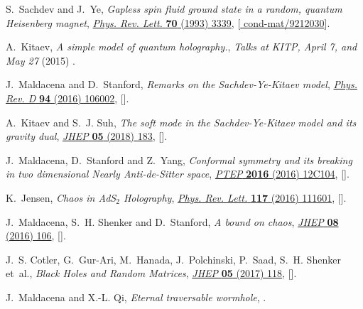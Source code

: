 \begin{thebibliography}{10}
S.~Sachdev and J.~Ye, \emph{{Gapless spin fluid ground state in a random,
  quantum Heisenberg magnet}},
  \href{http://dx.doi.org/10.1103/PhysRevLett.70.3339}{\emph{Phys. Rev. Lett.}
  {\bfseries 70} (1993) 3339},
  [\href{https://arxiv.org/abs/cond-mat/9212030}{{\ttfamily
  cond-mat/9212030}}].

A.~Kitaev, \emph{A simple model of quantum holography.}, {\emph{Talks at KITP,
  April 7, and May 27} (2015) }.

J.~Maldacena and D.~Stanford, \emph{{Remarks on the Sachdev-Ye-Kitaev model}},
  \href{http://dx.doi.org/10.1103/PhysRevD.94.106002}{\emph{Phys. Rev. D}
  {\bfseries 94} (2016) 106002},
  [\href{https://arxiv.org/abs/1604.07818}{{}}].

A.~Kitaev and S.~J. Suh, \emph{{The soft mode in the Sachdev-Ye-Kitaev model
  and its gravity dual}},
  \href{http://dx.doi.org/10.1007/JHEP05(2018)183}{\emph{JHEP} {\bfseries 05}
  (2018) 183}, [\href{https://arxiv.org/abs/1711.08467}{{}}].

J.~Maldacena, D.~Stanford and Z.~Yang, \emph{{Conformal symmetry and its
  breaking in two dimensional Nearly Anti-de-Sitter space}},
  \href{http://dx.doi.org/10.1093/ptep/ptw124}{\emph{PTEP} {\bfseries 2016}
  (2016) 12C104}, [\href{https://arxiv.org/abs/1606.01857}{{}}].

K.~Jensen, \emph{{Chaos in AdS$_2$ Holography}},
  \href{http://dx.doi.org/10.1103/PhysRevLett.117.111601}{\emph{Phys. Rev.
  Lett.} {\bfseries 117} (2016) 111601},
  [\href{https://arxiv.org/abs/1605.06098}{{}}].

J.~Maldacena, S.~H. Shenker and D.~Stanford, \emph{{A bound on chaos}},
  \href{http://dx.doi.org/10.1007/JHEP08(2016)106}{\emph{JHEP} {\bfseries 08}
  (2016) 106}, [\href{https://arxiv.org/abs/1503.01409}{{}}].

J.~S. Cotler, G.~Gur-Ari, M.~Hanada, J.~Polchinski, P.~Saad, S.~H. Shenker
  et~al., \emph{{Black Holes and Random Matrices}},
  \href{http://dx.doi.org/10.1007/JHEP05(2017)118}{\emph{JHEP} {\bfseries 05}
  (2017) 118}, [\href{https://arxiv.org/abs/1611.04650}{{}}].

J.~Maldacena and X.-L. Qi, \emph{{Eternal traversable wormhole}},
  \href{https://arxiv.org/abs/1804.00491}{{}}.


\end{thebibliography}
